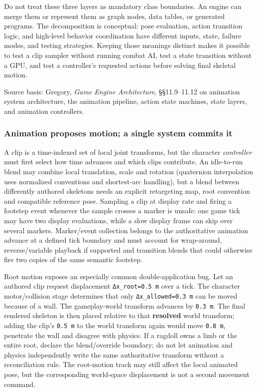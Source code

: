 Do not treat these three layers as mandatory class boundaries. An engine can merge them or represent them as graph nodes, data tables, or generated programs. The decomposition is conceptual: pose evaluation, action transition logic, and high-level behavior coordination have different inputs, state, failure modes, and testing strategies. Keeping those meanings distinct makes it possible to test a clip sampler without running combat AI, test a state transition without a GPU, and test a controller's requested actions before solving final skeletal motion.

Source basis: Gregory, \emph{Game Engine Architecture}, §§11.9--11.12 on animation system architecture, the animation pipeline, action state machines, state layers, and animation controllers.

\subsubsection{Animation proposes motion; a single system commits it}\label{06-engine-ii-ch040-animation-proposes-motion-a-single-system-commits-it}

A clip is a time-indexed set of local joint transforms, but the character \emph{controller} must first select how time advances and which clips contribute. An idle-to-run blend may combine local translation, scale and rotation (quaternion interpolation uses normalized conventions and shortest-arc handling), but a blend between differently authored skeletons needs an explicit retargeting map, root convention and compatible reference pose. Sampling a clip at display rate and firing a footstep event whenever the sample crosses a marker is unsafe: one game tick may have two display evaluations, while a slow display frame can skip over several markers. Marker/event collection belongs to the authoritative animation advance at a defined tick boundary and must account for wrap-around, reverse/variable playback if supported and transition blends that could otherwise fire two copies of the same semantic footstep.

Root motion exposes an especially common double-application bug. Let an authored clip request displacement \texttt{Δx\_root=0.5\ m} over a tick. The character motor/collision stage determines that only \texttt{Δx\_allowed=0.3\ m} can be moved because of a wall. The gameplay-world transform advances by \texttt{0.3\ m}. The final rendered skeleton is then placed relative to that \textbf{resolved} world transform; adding the clip's \texttt{0.5\ m} to the world transform again would move \texttt{0.8\ m}, penetrate the wall and disagree with physics. If a ragdoll owns a limb or the entire root, declare the blend/override boundary; do not let animation and physics independently write the same authoritative transform without a reconciliation rule. The root-motion track may still affect the local animated pose, but the corresponding world-space displacement is not a second movement command.

